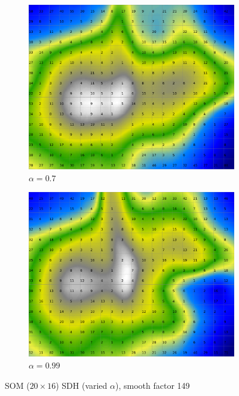 \documentclass{acm_proc_article-sp}
\begin{document}
\begin{figure}
\begin{subfigure}[b]{0.24\linewidth}
        \label{fig:wine-20x16-smoothed-data-histogram-alpha-0,45-f-149}
    \end{subfigure}
    \begin{subfigure}[b]{0.24\linewidth}
        \includegraphics[width=\linewidth]{img/wine-20x16-smoothed-data-histogram-alpha-0,7-f-149}
        \caption{$\alpha=0.7$}
        \label{fig:wine-20x16-smoothed-data-histogram-alpha-0,7-f-149}
    \end{subfigure}
    \begin{subfigure}[b]{0.24\linewidth}
        \includegraphics[width=\linewidth]{img/wine-20x16-smoothed-data-histogram-alpha-0,99-f-149}
        \caption{$\alpha=0.99$}
        \label{fig:wine-20x16-smoothed-data-histogram-alpha-0,99-f-149}
    \end{subfigure}
    \caption{SOM ($20\times16$) SDH (varied $\alpha$), smooth factor 149}
    \label{fig:wine-20x16-smoothed-data-histogram-alpha-f-149}
\end{figure}
\end{document}
